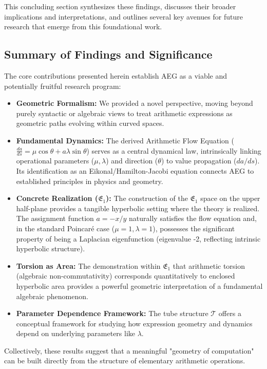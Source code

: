\documentclass[12pt]{article}
\begin{document}
This concluding section synthesizes these findings, discusses their broader implications and interpretations, and outlines several key avenues for future research that emerge from this foundational work.

\subsection{Summary of Findings and Significance}

The core contributions presented herein establish AEG as a viable and potentially fruitful research program:
\begin{itemize}
    \item \textbf{Geometric Formalism:} We provided a novel perspective, moving beyond purely syntactic or algebraic views to treat arithmetic expressions as geometric paths evolving within curved spaces.
    \item \textbf{Fundamental Dynamics:} The derived Arithmetic Flow Equation (\( \frac{da}{ds} = \mu \cos \theta + a \lambda \sin \theta \)) serves as a central dynamical law, intrinsically linking operational parameters (\( \mu, \lambda \)) and direction (\( \theta \)) to value propagation (\( da/ds \)). Its identification as an Eikonal/Hamilton-Jacobi equation connects AEG to established principles in physics and geometry.
    \item \textbf{Concrete Realization (\( \mathfrak{E}_1 \)):} The construction of the \( \mathfrak{E}_1 \) space on the upper half-plane provides a tangible hyperbolic setting where the theory is realized. The assignment function \( a = -x/y \) naturally satisfies the flow equation and, in the standard Poincaré case (\( \mu=1, \lambda=1 \)), possesses the significant property of being a Laplacian eigenfunction (eigenvalue -2, reflecting intrinsic hyperbolic structure).
    \item \textbf{Torsion as Area:} The demonstration within \( \mathfrak{E}_1 \) that arithmetic torsion (algebraic non-commutativity) corresponds quantitatively to enclosed hyperbolic area provides a powerful geometric interpretation of a fundamental algebraic phenomenon.
    \item \textbf{Parameter Dependence Framework:} The tube structure \( \mathcal{T} \) offers a conceptual framework for studying how expression geometry and dynamics depend on underlying parameters like \( \lambda \).
\end{itemize}
Collectively, these results suggest that a meaningful "geometry of computation" can be built directly from the structure of elementary arithmetic operations.
\end{document}
